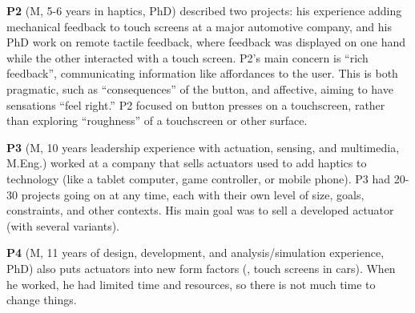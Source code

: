        \textbf{P2} (M, 5-6 years in haptics, PhD) described two projects: his experience adding mechanical feedback to touch screens at a major automotive company, and his PhD work on remote tactile feedback, where feedback was displayed on one hand while the other interacted with a touch screen. P2's main concern is ``rich feedback'', communicating information like affordances to the user. This is both pragmatic, such as ``consequences'' of the button, and affective, aiming to have sensations ``feel right.'' P2 focused on button presses on a touchscreen, rather than exploring ``roughness'' of a touchscreen or other surface. 
        
        \textbf{P3} (M, 10 years leadership experience with actuation, sensing, and multimedia, M.Eng.) worked at a company that sells actuators used to add haptics to technology (like a tablet computer, game controller, or mobile phone).
        P3 had 20-30 projects going on at any time, each with their own level of size, goals, constraints, and other contexts. His main goal was to sell a developed actuator (with several variants).
        
        \textbf{P4} (M, 11 years of design, development, and analysis/simulation experience, PhD) also puts actuators into new form factors (\eg, touch screens in cars). When he worked, he had limited time and resources, so there is not much time to change things. %
        
